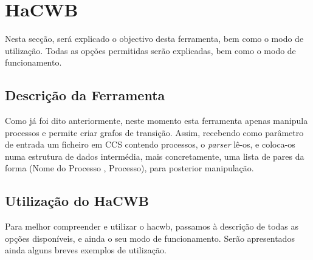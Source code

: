 \section{HaCWB}

Nesta secção, será explicado o objectivo desta ferramenta, bem como o modo de utilização. Todas 
as opções permitidas serão explicadas, bem como o modo de funcionamento.

\subsection{Descrição da Ferramenta}

Como já foi dito anteriormente, neste momento esta ferramenta apenas manipula processos e permite 
criar grafos de transição. Assim, recebendo como parâmetro de entrada um ficheiro em CCS contendo 
processos, o \textit{parser} lê-os, e coloca-os numa estrutura de dados intermédia, mais concretamente, 
uma lista de pares da forma (Nome do Processo , Processo), para posterior manipulação.

\subsection{Utilização do HaCWB}

Para melhor compreender e utilizar o hacwb, passamos à descrição de todas as opções disponíveis, e 
ainda o seu modo de funcionamento. Serão apresentados ainda alguns breves exemplos de utilização.

